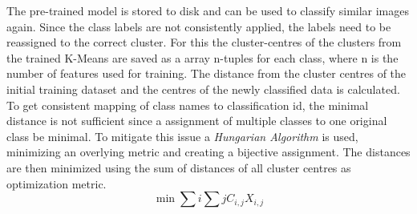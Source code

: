 \documentclass[12pt,a4paper, english]{article}
\begin{document}
    The pre-trained model is stored to disk and can be used to classify similar images again. 
    Since the class labels are not consistently applied, the labels need to be reassigned to the correct cluster.
    For this the cluster-centres of the clusters from the trained K-Means are saved as a array n-tuples for each class, where n is the number of features used for training.
    The distance from the cluster centres of the initial training dataset and the centres of the newly classified data is calculated. 
    To get consistent mapping of class names to classification id, the minimal distance is not sufficient since a assignment of multiple classes to one original class be minimal. 
    To mitigate this issue a \textit{Hungarian Algorithm} is used, minimizing an overlying metric and creating a bijective assignment. 
    The distances are then minimized using the sum of distances of all cluster centres as optimization metric.
      \begin{equation}
        \min \sum{i}\sum{j} C_{i,j}X_{i,j}
      \end{equation}
\end{document}
